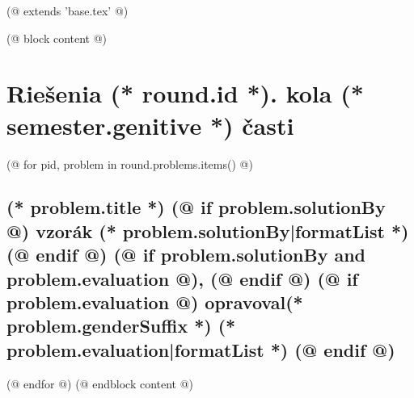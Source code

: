 (@ extends 'base.tex' @)
 
(@ block content @)
    

    \pagestyle{seminar-solutions-(* competition.id *)-(* volume.id *)-(* semester.id *)-(* round.id *)}
    \thispagestyle{seminar-first-(* competition.id *)-(* volume.id *)-(* semester.id *)}
    \vspace*{8mm}
   
    \section{\texorpdfstring{Riešenia (* round.id *). kola (* semester.genitive *) časti}{Riešenia}}
        
    (@ for pid, problem in round.problems.items() @)%
    \setcounter{volume}{(* volume.number *)}%
    \setcounter{semester}{(* semester.number *)}%
    \setcounter{round}{(* round.number *)}%
    \setcounter{problem}{(* problem.number *)}%

    \subsection{%
        \texorpdfstring{%
            \large \textbf{(* problem.title *)} \hfill \normalsize%
            (@ if problem.solutionBy @)%
                vzorák (* problem.solutionBy|formatList *)%
            (@ endif @)%
            (@ if problem.solutionBy and problem.evaluation @), (@ endif @)%
            (@ if problem.evaluation @)%
                opravoval(* problem.genderSuffix *) (* problem.evaluation|formatList *)%
            (@ endif @)%
        }{(* round.number *).(* problem.number *) (* problem.title *)}%
    }

    (@ endfor @)
(@ endblock content @)
